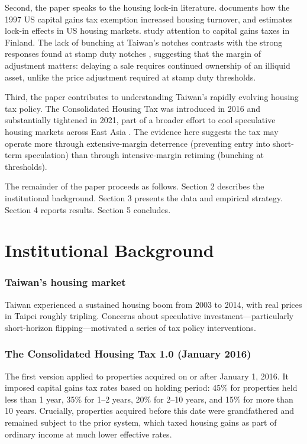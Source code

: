 \documentclass[12pt]{article}
\begin{document}
Second, the paper speaks to the housing lock-in literature. \citet{shan2011} documents how the 1997 US capital gains tax exemption increased housing turnover, and \citet{cunningham2024} estimates lock-in effects in US housing markets. \citet{eerola2019} study attention to capital gains taxes in Finland. The lack of bunching at Taiwan's notches contrasts with the strong responses found at stamp duty notches \citep{best2018, hilber2016}, suggesting that the margin of adjustment matters: delaying a sale requires continued ownership of an illiquid asset, unlike the price adjustment required at stamp duty thresholds.

Third, the paper contributes to understanding Taiwan's rapidly evolving housing tax policy. The Consolidated Housing Tax was introduced in 2016 and substantially tightened in 2021, part of a broader effort to cool speculative housing markets across East Asia \citep{chen2022}. The evidence here suggests the tax may operate more through extensive-margin deterrence (preventing entry into short-term speculation) than through intensive-margin retiming (bunching at thresholds).

The remainder of the paper proceeds as follows. Section 2 describes the institutional background. Section 3 presents the data and empirical strategy. Section 4 reports results. Section 5 concludes.


\section{Institutional Background}

\subsubsection*{Taiwan's housing market} Taiwan experienced a sustained housing boom from 2003 to 2014, with real prices in Taipei roughly tripling. Concerns about speculative investment---particularly short-horizon flipping---motivated a series of tax policy interventions.

\subsubsection*{The Consolidated Housing Tax 1.0 (January 2016)} The first version applied to properties acquired on or after January 1, 2016. It imposed capital gains tax rates based on holding period: 45\% for properties held less than 1 year, 35\% for 1--2 years, 20\% for 2--10 years, and 15\% for more than 10 years. Crucially, properties acquired before this date were grandfathered and remained subject to the prior system, which taxed housing gains as part of ordinary income at much lower effective rates.
\end{document}
